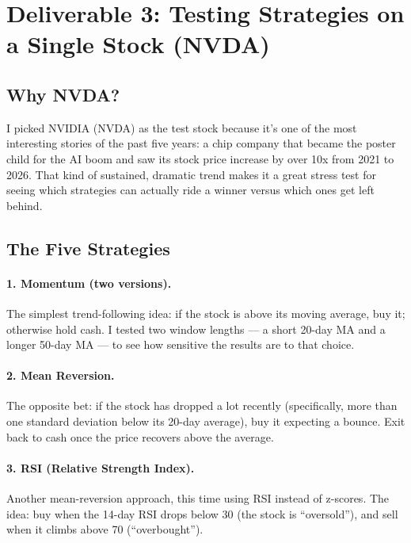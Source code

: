 \documentclass[11pt,a4paper]{article}
\begin{document}
\section{Deliverable 3: Testing Strategies on a Single Stock (NVDA)}

\subsection{Why NVDA?}

I picked NVIDIA (NVDA) as the test stock because it's one of the most interesting
stories of the past five years: a chip company that became the poster child for the
AI boom and saw its stock price increase by over 10x from 2021 to 2026.
That kind of sustained, dramatic trend makes it a great stress test for seeing
which strategies can actually ride a winner versus which ones get left behind.

\subsection{The Five Strategies}

\paragraph{1. Momentum (two versions).}
The simplest trend-following idea: if the stock is above its moving average,
buy it; otherwise hold cash.
I tested two window lengths --- a short 20-day MA and a longer 50-day MA ---
to see how sensitive the results are to that choice.

\paragraph{2. Mean Reversion.}
The opposite bet: if the stock has dropped a lot recently (specifically, more than
one standard deviation below its 20-day average), buy it expecting a bounce.
Exit back to cash once the price recovers above the average.

\paragraph{3. RSI (Relative Strength Index).}
Another mean-reversion approach, this time using RSI instead of z-scores.
The idea: buy when the 14-day RSI drops below 30 (the stock is ``oversold''),
and sell when it climbs above 70 (``overbought'').
\end{document}
